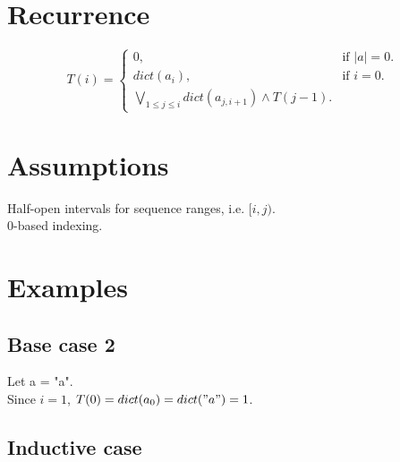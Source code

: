 \documentclass{article}
\begin{document}
	\section{Recurrence}
		\begin{equation}
			T(i)=\begin{cases}
				0, & \text{if $|a|=0$}.\\
				dict(a_i), & \text{if $i=0$}.\\
				\underset{1 \leq j \leq i}{\bigvee} dict(a_{j,i+1}) \wedge T(j-1).
			\end{cases}
		\end{equation}
	\section{Assumptions}
	Half-open intervals for sequence ranges, i.e. $[i,j)$.\\
	0-based indexing.
	
	\section{Examples}	
		\subsection{Base case 2}
			Let a = "a".\\
			Since $i=1$, $T(0) = dict(a_0) = dict("a") = 1$.
			
		\subsection{Inductive case}
	
\end{document}
